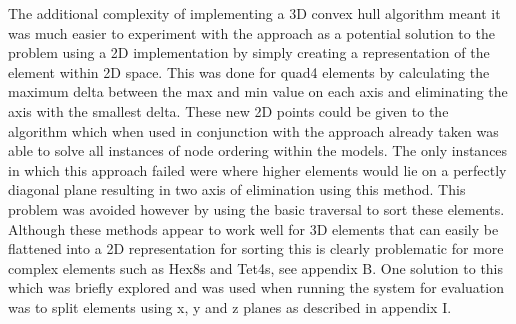


\noindent
\newline


\noindent
The additional complexity of implementing a 3D convex hull algorithm meant it was much easier to experiment with the approach as a potential solution to the problem using a 2D implementation by simply creating a representation of the element within 2D space. This was done for quad4 elements by calculating the maximum delta between the max and min value on each axis and eliminating the axis with the smallest delta. These new 2D points could be given to the algorithm which when used in conjunction with the approach already taken was able to solve all instances of node ordering within the models. The only instances in which this approach failed were where higher elements would lie on a perfectly diagonal plane resulting in two axis of elimination using this method. This problem was avoided however by using the basic traversal to sort these elements. \\ 

\noindent
Although these methods appear to work well for 3D elements that can easily be flattened into a 2D representation for sorting this is clearly problematic for more complex elements such as Hex8s and Tet4s, see appendix B. One solution to this which was briefly explored and was used when running the system for evaluation was to split elements using x, y and z planes as described in appendix I. 
